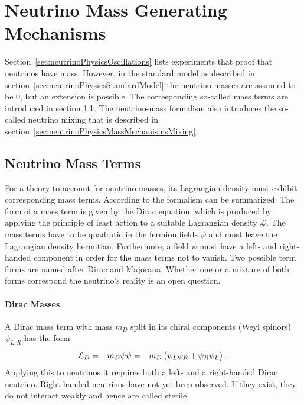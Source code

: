 \section{Neutrino Mass Generating Mechanisms}
\label{sec:neutrinoPhysicsMassMechanisms}
Section~\ref{sec:neutrinoPhysicsOscillations} lists experiments that proof that neutrinos have mass. However, in the standard model as described in section~\ref{sec:neutrinoPhysicsStandardModel} the neutrino masses are assumed to be 0, but an extension is possible. The corresponding so-called mass terms are introduced in section \ref{sec:neutrinoPhysicsMassMechanismsTerms}. The neutrino-mass formalism also introduces the so-called neutrino mixing that is described in section~\ref{sec:neutrinoPhysicsMassMechanismsMixing}.

\subsection{Neutrino Mass Terms}
\label{sec:neutrinoPhysicsMassMechanismsTerms}
For a theory to account for neutrino masses, its Lagrangian density must exhibit corresponding mass terms. According to \cite{zuber2011neutrino} the formalism can be summarized: The form of a mass term is given by the Dirac equation, which is produced by applying the principle of least action to a suitable Lagrangian density $\mathcal{L}$. The mass terms have to be quadratic in the fermion fields $\psi$ and must leave the Lagrangian density hermitian. Furthermore, a field $\psi$ must have a left- and right-handed component in order for the mass terms not to vanish. Two possible term forms are named after Dirac and Majorana. Whether one or a mixture of both forms correspond the neutrino's reality is an open question.

\paragraph{Dirac Masses}
A Dirac mass term with mass $m_D$ split in its chiral components (Weyl spinors) $\psi_{L,R}$ has the form~\cite{zuber2011neutrino}
\begin{equation}
\mathcal{L}_D =  -m_D \bar\psi\psi = -m_D \left(\bar\psi_L\psi_R + \bar\psi_R\psi_L \right) \text{\,.}
\end{equation}
Applying this to neutrinos it requires both a left- and a right-handed Dirac neutrino. Right-handed neutrinos have not yet been observed. If they exist, they do not interact weakly and hence are called sterile.

